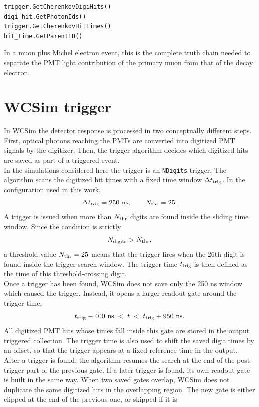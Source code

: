 \documentclass{article}
\numberwithin{table}{subsection}
\numberwithin{figure}{subsection}
\numberwithin{equation}{subsection}
\numberwithin{footnote}{subsection}
\begin{document}
\begin{lstlisting}
trigger.GetCherenkovDigiHits()
digi_hit.GetPhotonIds()
trigger.GetCherenkovHitTimes()
hit_time.GetParentID()
\end{lstlisting}
In a muon plus Michel electron event, this is the complete truth chain needed to
separate the PMT light contribution of the primary muon from that of the decay
electron.
\section{WCSim trigger}
\label{sec:wcsim_trigger}

In WCSim the detector response is processed in two conceptually different
steps. First, optical photons reaching the PMTs are converted into digitized
PMT signals by the digitizer. Then, the trigger algorithm decides which
digitized hits are saved as part of a triggered event. \\
In the simulations considered here the trigger is an \texttt{NDigits} trigger.
The algorithm scans the digitized hit times with a fixed time window
\(\Delta t_{\rm trig}\). In the configuration used in this work,
\[
  \Delta t_{\rm trig} = 250~{\rm ns},
  \qquad
  N_{\rm thr} = 25 .
\]
A trigger is issued when more than \(N_{\rm thr}\) digits are found inside
the sliding time window. Since the condition is strictly
\[
  N_{\rm digits} > N_{\rm thr},
\]
a threshold value \(N_{\rm thr}=25\) means that the trigger fires when the
26th digit is found inside the trigger-search window. The trigger time
\(t_{\rm trig}\) is then defined as the time of this threshold-crossing digit.\\
Once a trigger has been found, WCSim does not save only the 250 ns window
which caused the trigger. Instead, it opens a larger readout gate around the
trigger time,
\[
  t_{\rm trig} - 400~{\rm ns}
  \;<\;
  t
  \;<\;
  t_{\rm trig} + 950~{\rm ns}.
\]
All digitized PMT hits whose times fall inside this gate are stored in the
output triggered collection. The trigger time is also used to shift the saved
digit times by an offset, so that the trigger appears at a fixed reference
time in the output.\\
After a trigger is found, the algorithm resumes the search at the end of the
post-trigger part of the previous gate. If a later trigger is found, its own
readout gate is built in the same way. When two saved gates overlap, WCSim
does not duplicate the same digitized hits in the overlapping region. The
new gate is either clipped at the end of the previous one, or skipped if it is
\end{document}
